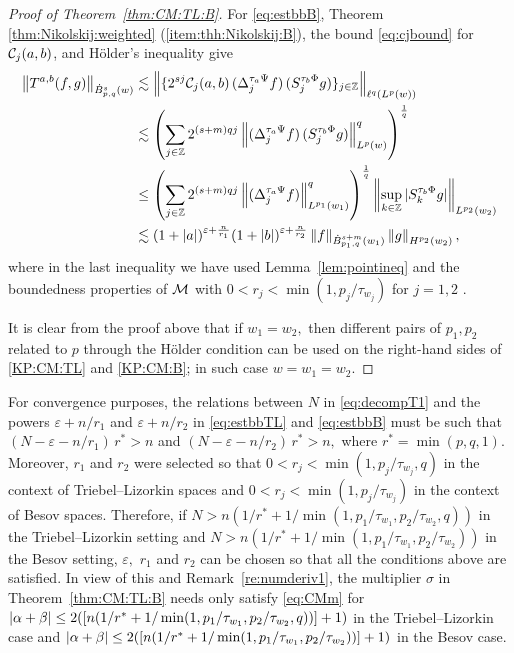 \begin{proof}[Proof of Theorem~\ref{thm:CM:TL:B}]
For \eqref{eq:estbbB},  Theorem \ref{thm:Nikolskij:weighted} (\ref{item:thh:Nikolskij:B}), the bound \eqref{eq:cjbound} for $\mathcal{C}_j(a,b)$, and H\"older's inequality  give
\begin{align*}
\left\|T^{a,b}(f,g)\right\|_{\dot{B}^s_{p,q}(w)} & \lesssim \left\|\{2^{sj} \mathcal{C}_j(a,b) \,(\Delta^{ \tau_a \Psi }_{j} f ) \, (S^{ \tau_b \Phi }_{j} g)\}_{j\in\mathbb{Z}} \right\|_{\ell^q(L^p(w))}\\
& \lesssim \left(\sum\limits_{j \in \mathbb{Z}}  2^{(s +m) q j}  \left\|(\Delta^{ \tau_a \Psi }_{j} f ) \, (S^{ \tau_b \Phi }_{j} g)\right\|_{L^p(w)}^q   \right)^\frac{1}{q}  \\
&\le  \left(\sum\limits_{j \in \mathbb{Z}}  2^{(s +m) q j}  \left\|(\Delta^{ \tau_a \Psi }_{j} f ) \right\|_{L^{p_1}(w_1)}^q   \right)^\frac{1}{q}  \left\|\sup_{k\in \mathbb{Z}}|S^{ \tau_b \Phi }_{k} g|\right\|_{L^{p_2}(w_2)}\\
& \lesssim  (1+\left\vert a \right\vert)^{\varepsilon+\frac{n}{r_1}}  (1+\left\vert b \right\vert)^{\varepsilon+\frac{n}{r_2}}  \left\|f\right\|_{\dot{B}^{s+m}_{p_1, q}(w_1)} \left\|g\right\|_{H^{p_2}(w_2)},
\end{align*}
where in the last inequality we have used Lemma~\ref{lem:pointineq} and the boundedness properties of $\mathcal{M}$ with  $0<r_j<\min(1,p_j/\tau_{w_j})$ for $j=1,2$ .


It is clear from the proof above that if $w_1=w_2,$ then  different pairs of $p_1, p_2$ related to $p$ through the H\"older condition can be used on the right-hand sides of \eqref{KP:CM:TL} and \eqref{KP:CM:B}; in such case $w=w_1=w_2.$  
\end{proof}


\begin{remark}\label{remark:thm:CM:TL:B}
For convergence purposes, the relations between $N$ in \eqref{eq:decompT1} and the powers  $\varepsilon+n/r_1$ and $\varepsilon+n/r_2$ in \eqref{eq:estbbTL} and   \eqref{eq:estbbB} must be such that $(N-\varepsilon-n/r_1)\,r^*>n$ and $(N-\varepsilon-n/r_2)\,r^*>n,$ where $r^*=\min(p,q,1).$ Moreover,  $r_1$ and $r_2$ were selected so that $0<r_j<\min(1, p_j/\tau_{w_j},q)$ in the context of  Triebel--Lizorkin spaces and  $0<r_j<\min(1,p_j/\tau_{w_j})$ in the context of Besov spaces. Therefore, if  $N>n(1/r^*+1/\min(1, p_1/\tau_{w_1},p_2/\tau_{w_2},q))$ in the Triebel--Lizorkin setting and $N>n(1/r^*+1/\min(1, p_1/\tau_{w_1},p_2/\tau_{w_2}))$ in the Besov setting,  $\varepsilon,$  $r_1$ and  $r_2$ can be chosen so that all the conditions above are satisfied. In view of this and Remark~\ref{re:numderiv1},  the multiplier $\sigma$ in Theorem~\ref{thm:CM:TL:B}  needs only satisfy  \eqref{eq:CMm} for $\left\vert \alpha+\beta \right\vert\le 2( [n(1/r^*+1/\min(1,p_1/\tau_{w_1},p_2/\tau_{w_2},q))]+1)$ in the Triebel--Lizorkin case and $\left\vert \alpha+\beta \right\vert\le 2( [n(1/r^*+1/\min(1, p_1/\tau_{w_1},p_2/\tau_{w_2}))]+1)$ in the Besov case. 
\end{remark}
